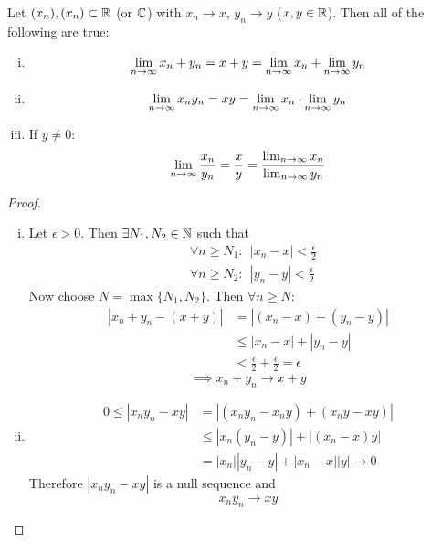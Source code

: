 \documentclass[../../script.tex]{subfiles}
\begin{document}
\begin{thm}\label{thm:lims}
Let $(x_n), (x_n) \subset \mathbb{R}$ (or $\mathbb{C}$) with $x_n \rightarrow x$, $y_n \rightarrow y$ ($x, y \in \mathbb{R}$). Then all of the following are true:
\begin{enumerate}[(i)]
	\item 
	\[
		\lim_{n \rightarrow \infty} x_n + y_n = x + y = \lim_{n \rightarrow \infty} x_n + \lim_{n \rightarrow \infty} y_n
	\]
	
	\item
	\[
		\lim_{n \rightarrow \infty} x_n y_n = xy = \lim_{n \rightarrow \infty} x_n \cdot \lim_{n \rightarrow \infty} y_n
	\]
	
	\item If $y \ne 0$: 
	\[
		\lim_{n \rightarrow \infty} \frac{x_n}{y_n} = \frac{x}{y} = \frac{\lim_{n \rightarrow \infty} x_n}{\lim_{n \rightarrow \infty} y_n}
	\]
\end{enumerate}
\end{thm}
\begin{proof}\leavevmode
\begin{enumerate}[(i)]
	\item Let $\epsilon > 0$. Then $\exists N_1, N_2 \in \mathbb{N}$ such that
	\begin{align}
		&\forall n \ge N_1: ~~|x_n - x| < \frac{\epsilon}{2} \\
		&\forall n \ge N_2: ~~|y_n - y| < \frac{\epsilon}{2}
	\end{align}
	Now choose $N = \max \{N_1, N_2\}$. Then $\forall n \ge N$:
	\begin{equation}
	\begin{split}
		|x_n + y_n - (x+y)| &= |(x_n - x) + (y_n - y)| \\
		&\le |x_n - x| + |y_n - y| \\
		&< \frac{\epsilon}{2} + \frac{\epsilon}{2} = \epsilon
	\end{split}
	\end{equation}
	\begin{equation}
		\implies x_n + y_n \longrightarrow x + y
	\end{equation}
	
	\item
	\begin{equation}
	\begin{split}
		0 \le |x_ny_n - xy| &= |(x_ny_n - x_ny) + (x_ny - xy)| \\
		&\le |x_n(y_n - y)| + |(x_n - x)y| \\
		&= |x_n||y_n - y| + |x_n - x||y| \longrightarrow 0
	\end{split}
	\end{equation}
	Therefore $|x_ny_n - xy|$ is a null sequence and
	\begin{equation}
		x_ny_n \longrightarrow xy
	\end{equation}
	

\end{enumerate}
\end{proof}
\end{document}
